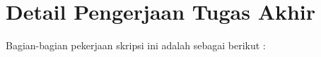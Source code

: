 \documentclass[a4paper,twoside]{article}
\begin{document}
	\section{Detail Pengerjaan Tugas Akhir}
	
	Bagian-bagian pekerjaan skripsi ini adalah sebagai berikut :
\end{document}
